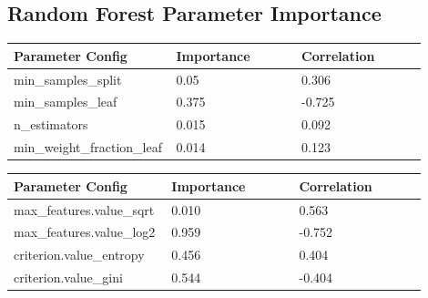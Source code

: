 \documentclass[11pt]{article}
\begin{document}
\begin{appendices}
\subsection{Random Forest Parameter Importance}
  \begin{table}[ht]
    \centering
    \begin{tabular}{|p{0.3\linewidth} | p{0.3\linewidth}| p{0.3\linewidth}|} 
      \hline
      \textbf{Parameter Config}  & \textbf{Importance} & \textbf{Correlation} \\ \hline
        min\_samples\_split & 0.05 & 0.306 \\ \hline
        min\_samples\_leaf & 0.375 & -0.725 \\ \hline
        n\_estimators & 0.015 & 0.092 \\ \hline
        min\_weight\_fraction\_leaf & 0.014 & 0.123 \\ \hline
    \end{tabular}
  \end{table}\label{RF_ParamImp}

  \begin{table}[ht]
    \centering
    \begin{tabular}{|p{0.3\linewidth} | p{0.3\linewidth}| p{0.3\linewidth}|} 
      \hline
      \textbf{Parameter Config}  & \textbf{Importance} & \textbf{Correlation} \\ \hline
      max\_features.value\_sqrt & 0.010 & 0.563 \\ \hline
      max\_features.value\_log2 & 0.959 & -0.752 \\ \hline
      criterion.value\_entropy & 0.456 & 0.404 \\ \hline
      criterion.value\_gini & 0.544 & -0.404 \\ \hline
    \end{tabular}
  \end{table}\label{RF_ParamImp}
  



\end{appendices}
\end{document}

